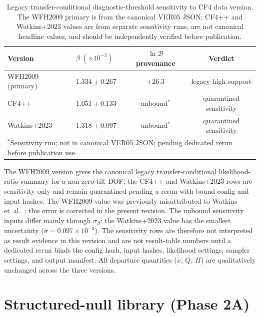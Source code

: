 \begin{table}[t]
\caption{Legacy transfer-conditional diagnostic-threshold sensitivity to CF4
  data version.
  The WFH2009 primary is from the canonical VER05 JSON;
  CF4++ and Watkins+2023 values are from separate sensitivity
  runs, are not canonical headline values, and should be
  independently verified before publication.}
\label{tab:cf4-triple}
\centering\footnotesize
\begin{tabular}{llcc}
\hline\hline
Version & $\beta \;(\times 10^{-3})$ &
  $\ln\mathcal{B}$ provenance & Verdict \\
\hline
WFH2009 (primary) & $1.334 \pm 0.267$ & $+26.3$ & legacy high-support \\
CF4++ & $1.051 \pm 0.133$ & unbound$^{*}$ & quarantined sensitivity \\
Watkins+2023 & $1.318 \pm 0.097$ & unbound$^{*}$ & quarantined sensitivity \\
\hline\hline
\multicolumn{4}{l}{\scriptsize $^{*}$Sensitivity run; not in canonical VER05 JSON; pending dedicated rerun before publication use.}
\end{tabular}
\end{table}

\noindent
The WFH2009 version gives the canonical legacy transfer-conditional
likelihood-ratio summary for a non-zero tilt DOF; the CF4++ and Watkins+2023
rows are sensitivity-only and remain quarantined pending a rerun with
bound config and input hashes.  The WFH2009 value was previously misattributed to
Watkins et~al.~\cite{Watkins2023}; this error is corrected in
the present revision.  The unbound sensitivity inputs differ mainly
through $\sigma_\beta$: the Watkins+2023 value has the smallest
uncertainty ($\sigma = 0.097 \times 10^{-3}$).  The sensitivity rows
are therefore not interpreted as result evidence in this revision and are
not result-table numbers until a dedicated rerun binds
the config hash, input hashes, likelihood settings, sampler settings,
and output manifest.  All departure
quantities ($x$, $Q$, $\Pi$) are qualitatively unchanged
across the three versions.


\section{Structured-null library (Phase 2A)}
\label{sec:struct-null-phase2}

